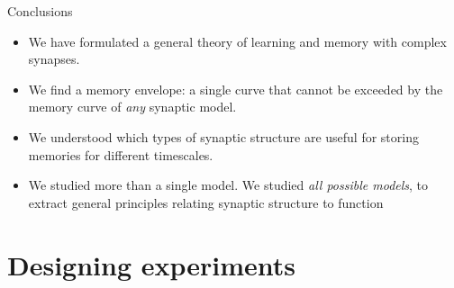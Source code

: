 \documentclass[final]{beamer}%
\begin{document}

\begin{frame}{Conclusions}
%
  \begin{itemize}
    \item We have formulated a general theory of learning and memory with complex synapses.
    \vp\item We find a memory envelope: a single curve that cannot be exceeded by the memory curve of \emph{any} synaptic model.
    \vp\item We understood which types of synaptic structure are useful for storing memories for different timescales.
    \vp\item We studied more than a single model. We studied \emph{all possible models}, to extract general principles relating synaptic structure to function
  \end{itemize}

%
\end{frame}


\section{Designing experiments}

\end{document}
